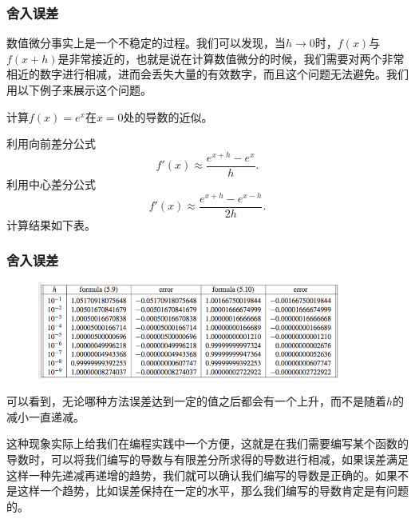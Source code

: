 \documentclass[10pt]{beamer}
\begin{document}
\begin{frame}
\frametitle{舍入误差}
数值微分事实上是一个不稳定的过程。我们可以发现，当$h \rightarrow 0$时，$f(x)$与$f(x+h)$是非常接近的，也就是说在计算数值微分的时候，我们需要对两个非常相近的数字进行相减，进而会丢失大量的有效数字，而且这个问题无法避免。我们用以下例子来展示这个问题。
\begin{example}
计算$f(x) = e^x$在$x = 0$处的导数的近似。
\end{example}

利用向前差分公式
\begin{equation}
\label{eq: foward difference exp(x)}
f'(x) \approx \frac{e^{x +h} - e^{x}}{h}.
\end{equation}
利用中心差分公式
\begin{equation}
\label{eq: centered difference exp(x)}
f'(x) \approx \frac{e^{x +h} - e^{x-h}}{2h}.
\end{equation}
计算结果如下表。
\end{frame}


\begin{frame}
\frametitle{舍入误差}
\begin{figure}
\includegraphics[width=10cm]{figs/5-1_Rounding_Error-1} 
\end{figure}
可以看到，无论哪种方法误差达到一定的值之后都会有一个上升，而不是随着$h$的减小一直递减。

\vspace{0.2cm}

这种现象实际上给我们在编程实践中一个方便，这就是在我们需要编写某个函数的导数时，可以将我们编写的导数与有限差分所求得的导数进行相减，如果误差满足这样一种先递减再递增的趋势，我们就可以确认我们编写的导数是正确的。如果不是这样一个趋势，比如误差保持在一定的水平，那么我们编写的导数肯定是有问题的。
\end{frame}
\end{document}

